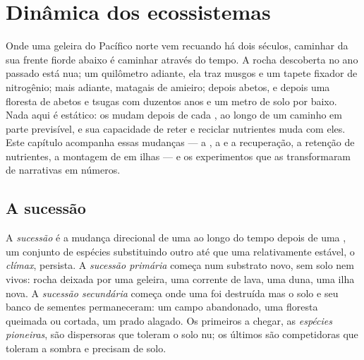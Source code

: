 \chapter{Dinâmica dos ecossistemas}\label{ch:b1:ecosystem-dynamics}

Onde uma geleira do Pacífico norte vem recuando há dois séculos,
caminhar da sua frente fiorde abaixo é caminhar através do tempo. A
rocha descoberta no ano passado está nua; um quilômetro adiante, ela
traz musgos e um tapete fixador de nitrogênio; mais adiante, matagais
de amieiro; depois abetos, e depois uma floresta de abetos e tsugas
com duzentos anos e um metro de solo por baixo. Nada aqui é estático:
os  mudam depois de cada , ao longo de um
caminho em parte previsível, e sua capacidade de reter e reciclar
nutrientes muda com eles. Este capítulo acompanha essas mudanças ---
a , a  e a recuperação, a retenção de nutrientes, a
montagem de  em ilhas --- e os experimentos que as
transformaram de narrativas em números.

\section{A sucessão}

\begin{definition}\label{def:b1:ecosystem-dynamics:succession}
A \emph{sucessão} é a mudança direcional de uma  ao longo do
tempo depois de uma , um conjunto de espécies substituindo
outro até que uma  relativamente estável, o \emph{clímax},
persista. A \emph{sucessão primária} começa num substrato novo, sem
solo nem  vivos: rocha deixada por uma geleira, uma corrente
de lava, uma duna, uma ilha nova. A \emph{sucessão secundária} começa
onde uma  foi destruída mas o solo e seu banco de sementes
permaneceram: um campo abandonado, uma floresta queimada ou cortada,
um prado alagado. Os primeiros a chegar, as \emph{espécies pioneiras},
são dispersoras que toleram o solo nu; os últimos são competidoras que
toleram a sombra e precisam de solo.
\end{definition}

